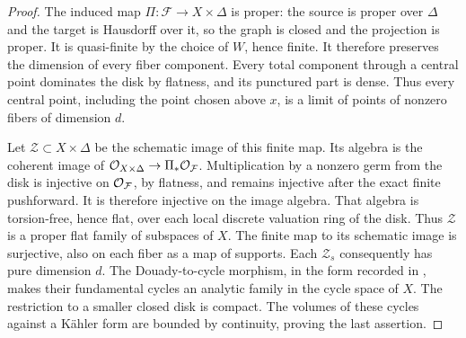 \begin{proof}
The induced map \(\Pi:\mathscr F\to X\times\Delta\) is proper:
the source is proper over \(\Delta\) and the target is
Hausdorff over it, so the graph is closed and the projection
is proper.  It is quasi-finite by the choice of \(W\),
hence finite.  It therefore preserves the dimension of
every fiber component.  Every total component through a central
point dominates the disk by flatness, and its punctured part is dense.
Thus every central point, including the point chosen above \(x\),
is a limit of points of nonzero fibers of dimension \(d\).

Let \(\mathscr Z\subset X\times\Delta\) be the schematic
image of this finite map.  Its algebra is the coherent image
of \(\mathcal O_{X\times\Delta}\to\Pi_*\mathcal O_{\mathcal{F}}\).
Multiplication by a nonzero
germ from the disk is injective on \(\mathcal O_{\mathcal{F}}\),
by flatness, and remains injective after the exact finite
pushforward.  It is therefore injective on the image algebra.
That algebra is torsion-free, hence flat, over each local
discrete valuation ring of the disk.  Thus \(\mathscr Z\)
is a proper flat family of subspaces of \(X\).  The finite
map to its schematic image is surjective, also on each
fiber as a map of supports.  Each \(\mathscr Z_s\) consequently
has pure dimension \(d\).  The Douady-to-cycle morphism, in the
form recorded in \cite[Section~3.3]{Fujiki1978}, makes their
fundamental cycles an analytic family in the cycle space
of \(X\).  The restriction to a smaller closed disk is
compact.  The volumes of these cycles against a Kähler
form are bounded by continuity, proving the last assertion.
\end{proof}

